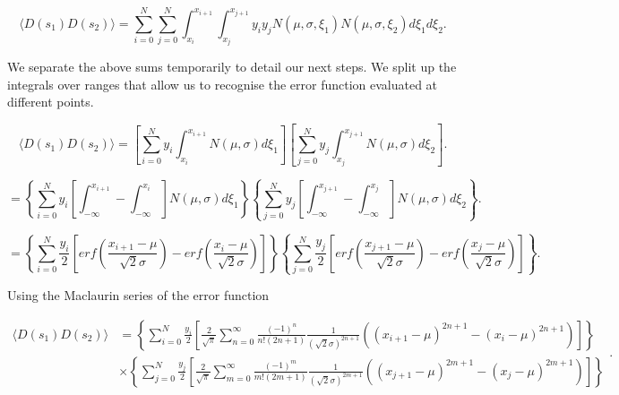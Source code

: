 \documentclass[apj]{emulateapj}
\begin{document}
\begin{equation}
\langle D(s_1) D(s_2) \rangle = \sum_{i=0}^N \sum_{j=0}^N  \int_{x_i}^{x_{i+1}} \int_{x_j}^{x_{j+1}} y_i y_j N(\mu, \sigma, \xi_1) N(\mu, \sigma, \xi_2) d\xi_1 d\xi_2.
\end{equation}

We separate the above sums temporarily to detail our next steps. We split up the integrals over ranges that allow us to recognise the error function evaluated at different points.

\begin{equation}
\langle D(s_1) D(s_2) \rangle = \left[ \sum_{i=0}^N  y_i \int_{x_i}^{x_{i+1}} N(\mu, \sigma)  d\xi_1 \right] \left[  \sum_{j=0}^N y_j \int_{x_j}^{x_{j+1}} N(\mu, \sigma)d\xi_2 \right].
\end{equation}

\begin{equation}
= \left\{ \sum_{i=0}^N  y_i \left[ \int_{-\infty}^{x_{i+1}} - \int_{-\infty}^{x_{i}} \right] N(\mu, \sigma)  d\xi_1 \right\} \left\{  \sum_{j=0}^N y_j \left[ \int_{-\infty}^{x_{j+1}} - \int_{-\infty}^{x_{j}} \right] N(\mu, \sigma)d\xi_2 \right\}.
\end{equation}

\begin{equation}
= \left\{ \sum_{i=0}^N  \frac{y_i}{2} \left[ erf \left( \frac{x_{i+1} - \mu}{\sqrt{2}\sigma} \right) - erf \left( \frac{x_{i} - \mu}{\sqrt{2}\sigma} \right) \right] \right\} \left\{  \sum_{j=0}^N \frac{y_j}{2} \left[ erf \left( \frac{x_{j+1} - \mu}{\sqrt{2}\sigma} \right) - erf \left( \frac{x_{j} - \mu}{\sqrt{2}\sigma} \right) \right] \right\}.
\end{equation}

Using the Maclaurin series of the error function

\begin{equation}
\begin{aligned}
\langle D(s_1) D(s_2) \rangle &= \left\{ \sum_{i=0}^N  \frac{y_i}{2} \left[ \frac{2}{\sqrt{\pi}} \sum_{n = 0}^\infty \frac{(-1)^n}{n! (2n+1)} \frac{1}{(\sqrt{2}\sigma)^{2n+1}} \left( (x_{i+1}-\mu)^{2n+1} - (x_{i}-\mu)^{2n+1} \right) \right] \right\} \\
&\times \left\{ \sum_{j=0}^N  \frac{y_j}{2} \left[ \frac{2}{\sqrt{\pi}} \sum_{m = 0}^\infty \frac{(-1)^m}{m! (2m+1)} \frac{1}{(\sqrt{2}\sigma)^{2m+1}} \left( (x_{j+1}-\mu)^{2m+1} - (x_{j}-\mu)^{2m+1} \right) \right] \right\}
\end{aligned}.
\end{equation}
\end{document}

